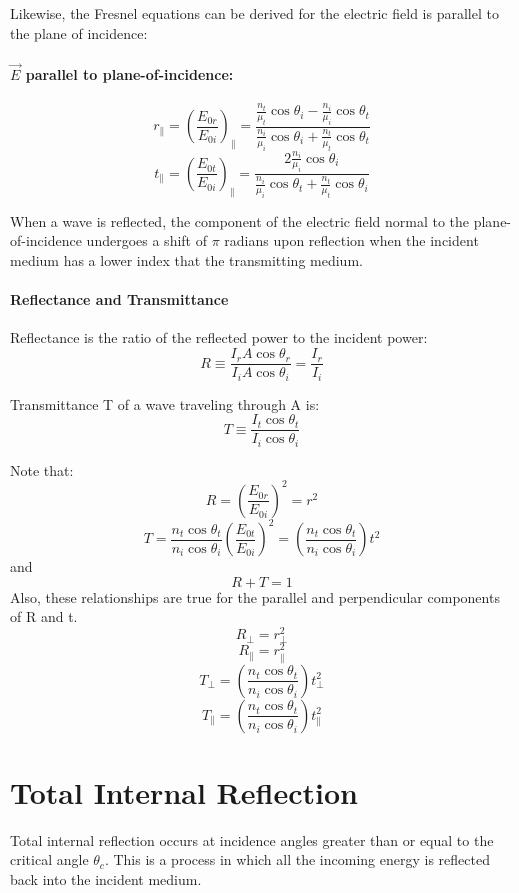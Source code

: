 \documentclass[12pt]{report}
\begin{document}
Likewise, the Fresnel equations can be derived for the electric field is parallel to the plane of incidence:
\paragraph{$\vec{E}$ parallel to plane-of-incidence:}
\begin{equation}
r_\parallel = \left(\frac{E_{0r}}{E_{0i}}\right)_\parallel = \frac{\frac{n_t}{\mu_t}\cos \theta_i-\frac{n_i}{\mu_i}\cos \theta_t}{\frac{n_i}{\mu_i}\cos \theta_i+\frac{n_t}{\mu_t}\cos \theta_t}
\end{equation}
\begin{equation}
t_\parallel = \left(\frac{E_{0t}}{E_{0i}}\right)_\parallel = \frac{2 \frac{n_i}{\mu_i}\cos \theta_i}{\frac{n_i}{\mu_i}\cos \theta_t+\frac{n_t}{\mu_t}\cos \theta_i}
\end{equation}

When a wave is reflected, the component of the electric field normal to the plane-of-incidence undergoes a shift of $\pi$ radians upon reflection when the incident medium has a lower index that the transmitting medium. 

\paragraph{Reflectance and Transmittance}
Reflectance is the ratio of the reflected power to the incident power:
\[R \equiv \frac{I_r A \cos \theta_r}{I_i A \cos \theta_i} = \frac{I_r}{I_i}\]

Transmittance T of a wave traveling through A is: 
\[T \equiv \frac{I_t \cos\theta_t}{I_i \cos\theta_i}\]

Note that:
\[R = \left(\frac{E_{0r}}{E_{0i}}\right)^2 = r^2\]
\[T = \frac{n_t \cos \theta_t}{n_i \cos \theta_i}\left(\frac{E_{0t}}{E_{0i}}\right)^2 = \left(\frac{n_t \cos \theta_t}{n_i \cos \theta_i}\right)t^2\]
and
\[R+T = 1\]
Also, these relationships are true for the parallel and perpendicular components of R and t. 
\[R_\perp = r_\perp^2\]
\[R_\parallel = r_\parallel^2\]
\[T_\perp = \left(\frac{n_t \cos \theta_t}{n_i \cos \theta_i}\right)t_\perp^2\]
\[T_\parallel = \left(\frac{n_t \cos \theta_t}{n_i \cos \theta_i}\right)t_\parallel^2\]
\section{Total Internal Reflection}
Total internal reflection occurs at incidence angles greater than or equal to the critical angle $\theta_c$. This is a process in which all the incoming energy is reflected back into the incident medium. 
\end{document}
